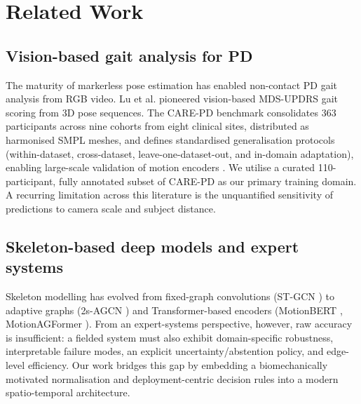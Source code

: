 \documentclass[preprint,12pt]{elsarticle}
\begin{document}
\section{Related Work}
\label{sec:related}

\subsection{Vision-based gait analysis for PD}
The maturity of markerless pose estimation \cite{cao2017openpose,
bazarevsky2020blazepose} has enabled non-contact PD gait analysis from RGB
video. Lu et al. \cite{lu2020vision,lu2021quantifying} pioneered vision-based
MDS-UPDRS gait scoring from 3D pose sequences. The CARE-PD benchmark
\cite{adeli2025carepd} consolidates 363 participants across nine cohorts from
eight clinical sites, distributed as harmonised SMPL meshes, and defines
standardised generalisation protocols (within-dataset, cross-dataset,
leave-one-dataset-out, and in-domain adaptation), enabling large-scale
validation of motion encoders \cite{gennarelli2025skelmamba,
tian2024crossspatiotemporal,adeli2024benchmarking}. We utilise a curated
110-participant, fully annotated subset of CARE-PD as our primary training
domain. A recurring limitation across this literature is the unquantified
sensitivity of predictions to camera scale and subject distance.

\subsection{Skeleton-based deep models and expert systems}
Skeleton modelling has evolved from fixed-graph convolutions
(ST-GCN \cite{yan2018spatial}) to adaptive graphs
(2s-AGCN \cite{shi2019twoStream}) and Transformer-based encoders
(MotionBERT \cite{zhu2023motionbert},
MotionAGFormer \cite{mehraban2024motionagformer}). From an expert-systems
perspective, however, raw accuracy is insufficient: a fielded system must also
exhibit domain-specific robustness, interpretable failure modes, an explicit
uncertainty/abstention policy, and edge-level efficiency. Our work bridges
this gap by embedding a biomechanically motivated normalisation and
deployment-centric decision rules into a modern spatio-temporal architecture.

\end{document}
